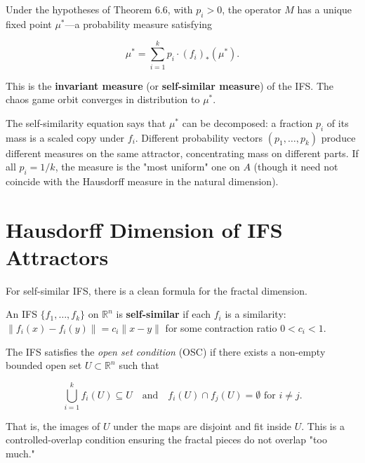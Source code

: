 \begin{theorem}
Under the hypotheses of Theorem 6.6, with $p_i > 0$, the operator $M$ has a unique fixed point $\mu^*$—a probability measure satisfying

\[\mu^* = \sum_{i=1}^{k} p_i \cdot (f_i)_{*}(\mu^*).\]

This is the \textbf{invariant measure} (or \textbf{self-similar measure}) of the IFS. The chaos game orbit converges in distribution to $\mu^*$.

The self-similarity equation says that $\mu^*$ can be decomposed: a fraction $p_i$ of its mass is a scaled copy under $f_i$. Different probability vectors $(p_1, \ldots, p_k)$ produce different measures on the same attractor, concentrating mass on different parts. If all $p_i = 1/k$, the measure is the "most uniform" one on $A$ (though it need not coincide with the Hausdorff measure in the natural dimension).
\end{theorem}

\section{Hausdorff Dimension of IFS Attractors}

For self-similar IFS, there is a clean formula for the fractal dimension.

\begin{definition}
An IFS $\{ f_1, \ldots, f_k\} $ on $\mathbb{R}^n$ is \textbf{self-similar} if each $f_i$ is a similarity: $\|f_i(x) - f_i(y)\| = c_i \|x - y\|$ for some contraction ratio $0 < c_i < 1$.
\end{definition}

\begin{definition}
The IFS satisfies the \textit{open set condition} (OSC) if there exists a non-empty bounded open set $U \subset \mathbb{R}^n$ such that

\[\bigcup_{i=1}^k f_i(U) \subseteq U \quad \text{and} \quad f_i(U) \cap f_j(U) = \emptyset \text{ for } i \ne j.\]

That is, the images of $U$ under the maps are disjoint and fit inside $U$. This is a controlled-overlap condition ensuring the fractal pieces do not overlap "too much."
\end{definition}

